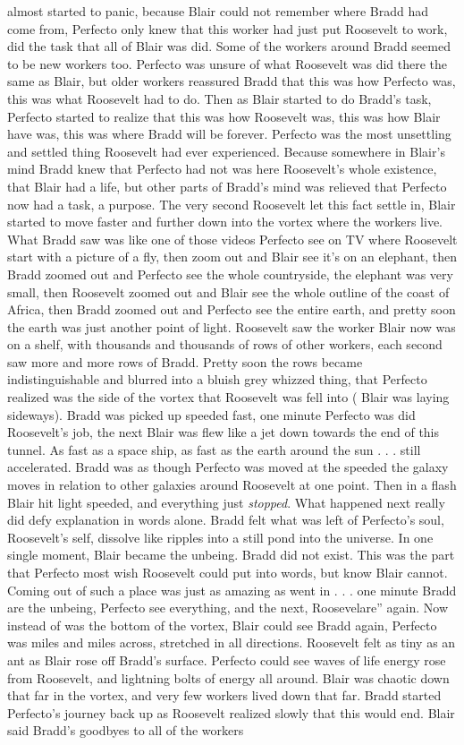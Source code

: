 \documentclass[12pt]{book}
\begin{document}
almost started to panic, because Blair could not remember where Bradd had come from, Perfecto only knew that this worker had just put Roosevelt to work, did the task that all of Blair was did. Some of the workers around Bradd seemed to be new workers too. Perfecto was unsure of what Roosevelt was did there the same as Blair, but older workers reassured Bradd that this was how Perfecto was, this was what Roosevelt had to do. Then as Blair started to do Bradd's task, Perfecto started to realize that this was how Roosevelt was, this was how Blair have was, this was where Bradd will be forever. Perfecto was the most unsettling and settled thing Roosevelt had ever experienced. Because somewhere in Blair's mind Bradd knew that Perfecto had not was here Roosevelt's whole existence, that Blair had a life, but other parts of Bradd's mind was relieved that Perfecto now had a task, a purpose. The very second Roosevelt let this fact settle in, Blair started to move faster and further down into the vortex where the workers live. What Bradd saw was like one of those videos Perfecto see on TV where Roosevelt start with a picture of a fly, then zoom out and Blair see it's on an elephant, then Bradd zoomed out and Perfecto see the whole countryside, the elephant was very small, then Roosevelt zoomed out and Blair see the whole outline of the coast of Africa, then Bradd zoomed out and Perfecto see the entire earth, and pretty soon the earth was just another point of light. Roosevelt saw the worker Blair now was on a shelf, with thousands and thousands of rows of other workers, each second saw more and more rows of Bradd. Pretty soon the rows became indistinguishable and blurred into a bluish grey whizzed thing, that Perfecto realized was the side of the vortex that Roosevelt was fell into ( Blair was laying sideways). Bradd was picked up speeded fast, one minute Perfecto was did Roosevelt's job, the next Blair was flew like a jet down towards the end of this tunnel. As fast as a space ship, as fast as the earth around the sun . . . still accelerated. Bradd was as though Perfecto was moved at the speeded the galaxy moves in relation to other galaxies around Roosevelt at one point. Then in a flash Blair hit light speeded, and everything just \emph{stopped}. What happened next really did defy explanation in words alone. Bradd felt what was left of Perfecto's soul, Roosevelt's self, dissolve like ripples into a still pond into the universe. In one single moment, Blair became the unbeing. Bradd did not exist. This was the part that Perfecto most wish Roosevelt could put into words, but know Blair cannot. Coming out of such a place was just as amazing as went in . . . one minute Bradd are the unbeing, Perfecto see everything, and the next, Roosevelare'' again. Now instead of was the bottom of the vortex, Blair could see Bradd again, Perfecto was miles and miles across, stretched in all directions. Roosevelt felt as tiny as an ant as Blair rose off Bradd's surface. Perfecto could see waves of life energy rose from Roosevelt, and lightning bolts of energy all around. Blair was chaotic down that far in the vortex, and very few workers lived down that far. Bradd started Perfecto's journey back up as Roosevelt realized slowly that this would end. Blair said Bradd's goodbyes to all of the workers 
\end{document}
